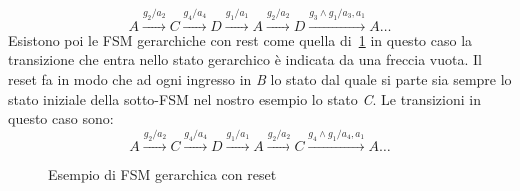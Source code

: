 $$A\xrightarrow{g_2/a_2}C\xrightarrow{g_4/a_4}D\xrightarrow{g_1/a_1}A\xrightarrow{g_2/a_2}D\xrightarrow{g_3\wedge g_1/a_3,a_1}A\dots$$
Esistono poi le FSM gerarchiche con rest come quella di \figurename\,\ref{fig:gerarchicareset} in questo caso la transizione che entra nello stato gerarchico è indicata da una freccia vuota. Il reset fa in modo che ad ogni ingresso in \emph{B} lo stato dal quale si parte sia sempre lo stato iniziale della sotto-FSM nel nostro esempio lo stato \emph{C}. Le transizioni in questo caso sono:
$$A\xrightarrow{g_2/a_2}C\xrightarrow{g_4/a_4}D\xrightarrow{g_1/a_1}A\xrightarrow{g_2/a_2}C\xrightarrow{g_4\wedge g_1/a_4,a_1}A\dots$$
\begin{figure}
\centering
{}
\caption{Esempio di FSM gerarchica con reset}\label{fig:gerarchicareset}
\end{figure}
